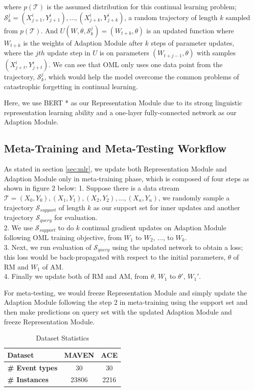 where $p(\mathcal{T})$ is the assumed distribution for this continual learning problem; $\mathcal{S}_k ^ j = (X_{j+1}^i, Y_{j+1}^i), ..., (X_{j+k}^i, Y_{j+k}^i)$, a random trajectory of length $k$ sampled from $p(\mathcal{T})$. And $U(W, \theta, \mathcal{S}_k ^ j) = (W_{t+k}, \theta)$ is an updated function where $W_{t+k}$ is the weights of Adaption Module after $k$ steps of parameter updates, where the $jth$ update step in $U$ is on parameters $(W_{t+j-1}, \theta)$ with samples $(X_{j+t}^i, Y_{j+t}^i)$. We can see that OML only uses one data point from the trajectory, $\mathcal{S}_k ^ j$, which would help the model overcome the common problems of catastrophic forgetting in continual learning. 

Here, we use BERT * as our Representation Module due to its strong linguistic representation learning ability and a one-layer fully-connected network as our Adaption Module. 

\subsection{Meta-Training and Meta-Testing Workflow}
As stated in section \ref{sec:mlr}, we update both Representation Module and Adaption Module only in meta-training phase, which is composed of four steps as shown in figure 2 below: 
1. Suppose there is a data stream $\mathcal{T} = (X_0, Y_0), (X_1, Y_1), (X_2, Y_2), ..., (X_n, Y_n)$, we randomly sample a trajectory $\mathcal{S}_{support}$ of length $k$ as our support set for inner updates and another trajectory $\mathcal{S}_{query}$ for evaluation. \\
2. We use $\mathcal{S}_{support}$ to do $k$ continual gradient updates on Adaption Module following OML training objective, from  $W_1$ to $W_2$, ..., to $W_k$. \\
3. Next, we run evaluation of $\mathcal{S}_{query}$ using the updated network to obtain a loss; this loss would be back-propagated with respect to the initial parameters, $\theta$ of RM and $W_1$ of AM. \\
4. Finally we update both of RM and AM, from  $\theta$, $W_1$ to $\theta'$, $W_1'$.

For meta-testing, we would freeze Representation Module and simply update the Adaption Module following the step 2 in meta-training using the support set and then make predictions on query set with the updated Adaption Module and freeze Representation Module.

\begin{table}[h]
\centering
\begin{tabular}{lcc}
\hline
\textbf{Dataset} & \textbf{MAVEN} & \textbf{ACE} \\
\hline
\textbf{\# Event types}& {30} & {30} \\
\textbf{\# Instances} & {23806}& {2216} \\
\hline
\end{tabular}
\caption{Dataset Statistics}
\label{tab:stats}
\end{table}